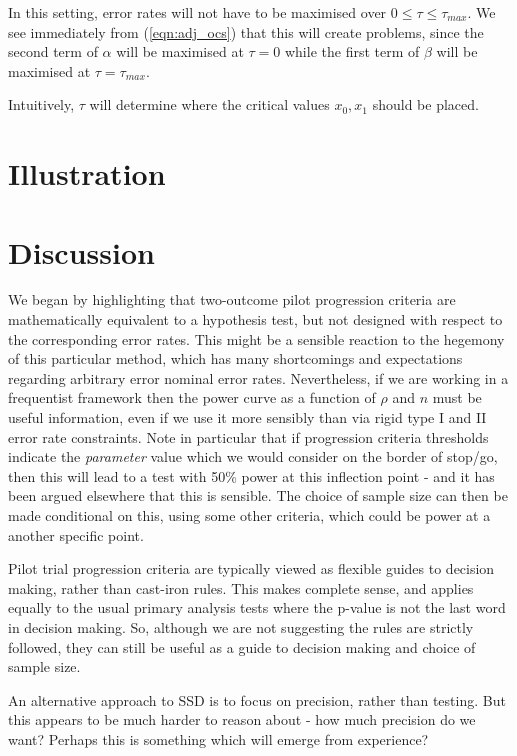 \documentclass[Crown, times, sagev]{sagej}
\begin{document}
In this setting, error rates will not have to be maximised over $0 \leq \tau \leq \tau_{max}$. We see immediately from (\ref{eqn:adj_ocs}) that this will create problems, since the second term of $\alpha$ will be maximised at $\tau = 0$ while the first term of $\beta$ will be maximised at $\tau = \tau_{max}$.

Intuitively, $\tau$ will determine where the critical values $x_0, x_1$ should be placed.

\section{Illustration}\label{sec:illustrate}

\section{Discussion}\label{sec:discussion}

We began by highlighting that two-outcome pilot progression criteria are mathematically equivalent to a hypothesis test, but not designed with respect to the corresponding error rates. This might be a sensible reaction to the hegemony of this particular method, which has many shortcomings and expectations regarding arbitrary error nominal error rates. Nevertheless, if we are working in a frequentist framework then the power curve as a function of $\rho$ and $n$ must be useful information, even if we use it more sensibly than via rigid type I and II error rate constraints. Note in particular that if progression criteria thresholds indicate the \emph{parameter} value which we would consider on the border of stop/go, then this will lead to a test with 50\% power at this inflection point - and it has been argued elsewhere that this is sensible. The choice of sample size can then be made conditional on this, using some other criteria, which could be power at a another specific point.

Pilot trial progression criteria are typically viewed as flexible guides to decision making, rather than cast-iron rules. This makes complete sense, and applies equally to the usual primary analysis tests where the p-value is not the last word in decision making. So, although we are not suggesting the rules are strictly followed, they can still be useful as a guide to decision making and choice of sample size.

An alternative approach to SSD is to focus on precision, rather than testing. But this appears to be much harder to reason about - how much precision do we want? Perhaps this is something which will emerge from experience?
\end{document}
